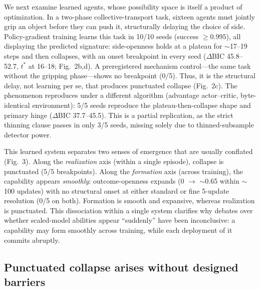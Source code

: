 \documentclass[11pt]{article}
\begin{document}
We next examine learned agents, whose
possibility space is itself a product of optimization.
In a two-phase collective-transport task, sixteen agents must jointly
grip an object before they can push it, structurally delaying the
choice of side. Policy-gradient training\citep{williams1992simple}
learns this task in 10/10 seeds (success $\geq 0.995$), all displaying
the predicted signature: side-openness holds at a plateau for
$\sim$17--19 steps and then collapses, with an onset breakpoint in
every seed ($\Delta$BIC 45.8--52.7, $t^{*}$ at 16--18; Fig.~2b,d). A
preregistered mechanism control---the same task without the gripping
phase---shows no breakpoint (0/5). Thus, it is the structural delay,
not learning per se, that produces punctuated collapse (Fig.~2c). The
phenomenon reproduces under a different
algorithm\citep{mnih2016asynchronous} (advantage actor--critic,
byte-identical environment): 5/5 seeds reproduce the
plateau-then-collapse shape and primary hinge ($\Delta$BIC
37.7--45.5). This is a partial replication, as the strict thinning
clause passes in only 3/5 seeds, missing solely due to
thinned-subsample detector power.

This learned system separates two senses of emergence
that are usually conflated (Fig.~3). Along the \emph{realization}
axis (within a single episode), collapse is punctuated (5/5
breakpoints). Along the \emph{formation} axis (across training), the
capability appears \emph{smoothly}: outcome-openness expands
(0 $\to$ $\sim$0.65 within $\sim$100 updates) with no structural onset
at either standard or fine 5-update resolution (0/5 on both).
Formation is smooth and expansive, whereas realization is punctuated.
This dissociation within a single system clarifies why debates over
whether scaled-model abilities appear ``suddenly'' have been
inconclusive\citep{wei2022emergent,schaeffer2023emergent}: a
capability may form smoothly across training, while each deployment of
it commits abruptly.

\subsection*{Punctuated collapse arises without designed barriers}
\end{document}
